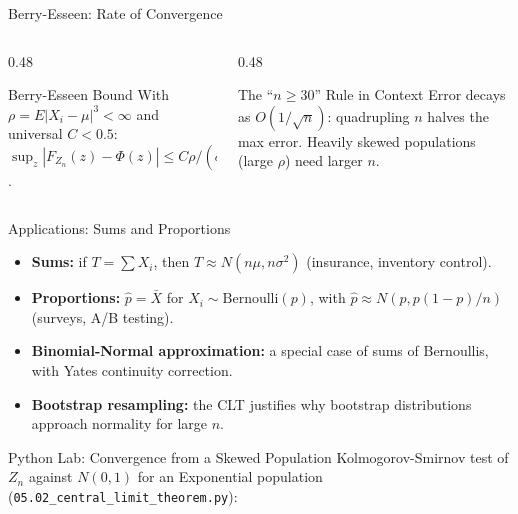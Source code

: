\documentclass[aspectratio=169,xcolor={dvipsnames,table}]{beamer}
\begin{document}
\begin{frame}{Berry-Esseen: Rate of Convergence}
	\vspace{-0.15cm}
	\begin{columns}[T]
		\begin{column}{0.48\textwidth}
			\begin{block}{Berry-Esseen Bound}
				\footnotesize
				With $\rho=E|X_i-\mu|^3<\infty$ and universal $C<0.5$: $\sup_z|F_{Z_n}(z)-\Phi(z)| \le C\rho/(\sigma^3\sqrt n)$.
			\end{block}
		\end{column}
		\begin{column}{0.48\textwidth}
			\begin{alertblock}{The ``$n\ge30$'' Rule in Context}
				\footnotesize
				Error decays as $O(1/\sqrt n)$: quadrupling $n$ halves the max error. Heavily skewed populations (large $\rho$) need larger $n$.
			\end{alertblock}
		\end{column}
	\end{columns}
\end{frame}

\begin{frame}{Applications: Sums and Proportions}
	\vspace{-0.1cm}
	\begin{itemize}\itemsep=0.1cm
		\item \textbf{Sums:} if $T=\sum X_i$, then $T \approx N(n\mu, n\sigma^2)$ (insurance, inventory control). \pause
		\item \textbf{Proportions:} $\hat p = \bar X$ for $X_i \sim \text{Bernoulli}(p)$, with $\hat p \approx N(p, p(1-p)/n)$ (surveys, A/B testing). \pause
		\item \textbf{Binomial-Normal approximation:} a special case of sums of Bernoullis, with Yates continuity correction. \pause
		\item \textbf{Bootstrap resampling:} the CLT justifies why bootstrap distributions approach normality for large $n$.
	\end{itemize}
\end{frame}

\begin{frame}[fragile]{Python Lab: Convergence from a Skewed Population}
	\vspace{-0.05cm}
	\scriptsize
	Kolmogorov-Smirnov test of $Z_n$ against $N(0,1)$ for an Exponential population (\texttt{05.02\_central\_limit\_theorem.py}):
	{
	}
\end{frame}
\end{document}
